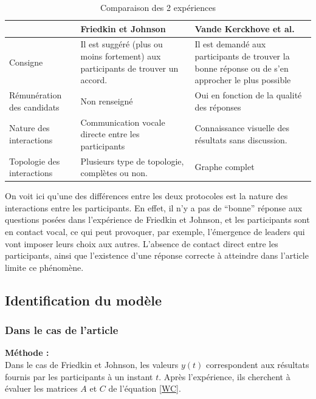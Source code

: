 \documentclass{scrreprt}
\begin{document}
  

\begin{table}
	\begin{tabular}{|p{4cm}|p{4.5cm}|p{4.5cm}|}
		\hline
 & Friedkin et Johnson \cite{FJ} & Vande Kerckhove et al. \cite{VMG} \tabularnewline
		\hline
Consigne & Il est suggéré (plus ou moins fortement) aux participants de trouver un accord. &Il est demandé aux participants de trouver la bonne réponse ou de s’en approcher le plus possible\tabularnewline
		\hline
Rémunération des candidats & Non renseigné & Oui en fonction de la qualité des réponses \tabularnewline
		\hline
Nature des interactions & Communication vocale directe entre les participants & Connaissance visuelle des résultats sans discussion.\tabularnewline
		\hline
Topologie des interactions & Plusieurs type de topologie, complètes ou non. & Graphe complet\tabularnewline
		\hline
	\end{tabular}
	\caption{Comparaison des 2 expériences}
\end{table}

 

On voit ici qu'une des différences entre les deux protocoles est la nature des interactions entre les participants. En effet, il n’y a pas de “bonne” réponse aux questions posées dans l'expérience de Friedkin et Johnson, et les participants sont en contact vocal, ce qui peut provoquer, par exemple, l’émergence de leaders qui vont imposer leurs choix aux autres. L’absence de contact direct entre les participants, ainsi que l’existence d’une réponse correcte à atteindre dans l'article \cite{VMG} limite ce phénomène.\\

\subsection{Identification du modèle}

\subsubsection{Dans le cas de l'article \cite{FJ}}

\textbf{Méthode :} \\

Dans le cas de Friedkin et Johnson, les valeurs $y(t)$ correspondent aux résultats fournis par les participants à un instant $t$. Après l'expérience, ils cherchent à évaluer les matrices $A$ et $C$ de l'équation \eqref{WC}. \\ %
\end{document}
